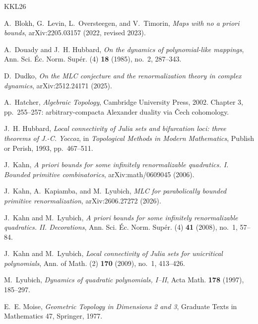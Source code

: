 \documentclass[11pt,reqno]{amsart}
\numberwithin{equation}{section}
\theoremstyle{plain}
\theoremstyle{definition}
\theoremstyle{remark}
\begin{document}
\begin{thebibliography}{KKL26}

A.~Blokh, G.~Levin, L.~Oversteegen, and V.~Timorin,
\emph{Maps with no a priori bounds},
arXiv:2205.03157 (2022, revised 2023).

A.~Douady and J.~H. Hubbard,
\emph{On the dynamics of polynomial-like mappings},
Ann. Sci. \'Ec. Norm. Sup\'er. (4) \textbf{18} (1985), no.~2, 287--343.

D.~Dudko,
\emph{On the MLC conjecture and the renormalization theory in complex
dynamics},
arXiv:2512.24171 (2025).

A.~Hatcher,
\emph{Algebraic Topology},
Cambridge University Press, 2002.  Chapter 3, pp.~255--257:
arbitrary-compacta Alexander duality via \v Cech cohomology.

J.~H. Hubbard,
\emph{Local connectivity of Julia sets and bifurcation loci: three
theorems of J.-C. Yoccoz},
in \emph{Topological Methods in Modern Mathematics},
Publish or Perish, 1993, pp.~467--511.

J.~Kahn,
\emph{A priori bounds for some infinitely renormalizable quadratics. I.
Bounded primitive combinatorics},
arXiv:math/0609045 (2006).

J.~Kahn, A.~Kapiamba, and M.~Lyubich,
\emph{MLC for parabolically bounded primitive renormalization},
arXiv:2606.27272 (2026).

J.~Kahn and M.~Lyubich,
\emph{A priori bounds for some infinitely renormalizable quadratics.
II. Decorations},
Ann. Sci. \'Ec. Norm. Sup\'er. (4) \textbf{41} (2008), no.~1, 57--84.

J.~Kahn and M.~Lyubich,
\emph{Local connectivity of Julia sets for unicritical polynomials},
Ann. of Math. (2) \textbf{170} (2009), no.~1, 413--426.

M.~Lyubich,
\emph{Dynamics of quadratic polynomials, I--II},
Acta Math. \textbf{178} (1997), 185--297.

E.~E. Moise,
\emph{Geometric Topology in Dimensions 2 and 3},
Graduate Texts in Mathematics 47, Springer, 1977.

\end{thebibliography}
\end{document}
